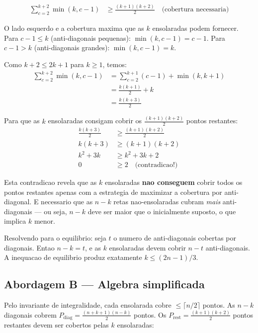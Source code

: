 \documentclass[5p]{elsarticle}
\theoremstyle{definition}
\begin{document}
\begin{align}
  \sum_{c=2}^{k+2} \min(k, c-1) &\geq \frac{(k+1)(k+2)}{2} \quad \text{(cobertura necessaria)}
\end{align}

O lado esquerdo e a cobertura maxima que as $k$ ensolaradas podem fornecer.
Para $c-1 \leq k$ (anti-diagonais pequenas): $\min(k, c-1) = c-1$.
Para $c-1 > k$ (anti-diagonais grandes): $\min(k, c-1) = k$.

Como $k+2 \leq 2k+1$ para $k \geq 1$, temos:
\begin{align}
  \sum_{c=2}^{k+2} \min(k, c-1)
  &= \sum_{c=2}^{k+1} (c-1) + \min(k, k+1) \\
  &= \frac{k(k+1)}{2} + k \\
  &= \frac{k(k+3)}{2}
\end{align}

Para que as $k$ ensolaradas consigam cobrir os $\frac{(k+1)(k+2)}{2}$ pontos restantes:
\begin{align}
  \frac{k(k+3)}{2} &\geq \frac{(k+1)(k+2)}{2} \\
  k(k+3) &\geq (k+1)(k+2) \\
  k^2 + 3k &\geq k^2 + 3k + 2 \\
  0 &\geq 2 \quad \text{(contradicao!)}
\end{align}

Esta contradicao revela que as $k$ ensolaradas \textbf{nao conseguem} cobrir todos os
pontos restantes apenas com a estrategia de maximizar a cobertura por anti-diagonal.
E necessario que as $n-k$ retas nao-ensolaradas cubram \textit{mais} anti-diagonais —
ou seja, $n-k$ deve ser maior que o inicialmente suposto, o que implica $k$ menor.

Resolvendo para o equilibrio: seja $t$ o numero de anti-diagonais cobertas por
diagonais. Entao $n-k = t$, e as $k$ ensolaradas devem cobrir $n-t$ anti-diagonais.
A inequacao de equilibrio produz exatamente $k \leq (2n-1)/3$.

\subsection{Abordagem B — Algebra simplificada}

Pelo invariante de integralidade, cada ensolarada cobre $\leq \lceil n/2 \rceil$ pontos.
As $n-k$ diagonais cobrem $P_{\text{diag}} = \frac{(n+k+1)(n-k)}{2}$ pontos.
Os $P_{\text{rest}} = \frac{(k+1)(k+2)}{2}$ pontos restantes devem ser cobertos
pelas $k$ ensolaradas:
\end{document}
